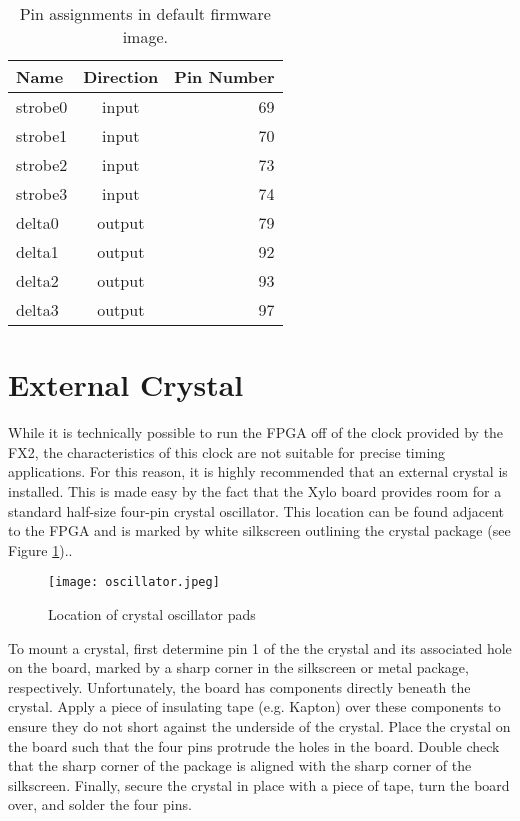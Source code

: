 \begin{table}
  \center
  \begin{tabular}{|lcr|}
    \hline
    Name    & Direction & Pin Number \\
    \hline
    strobe0 & input  & 69 \\
    strobe1 & input  & 70 \\
    strobe2 & input  & 73 \\
    strobe3 & input  & 74 \\
    \hline
    delta0  & output & 79 \\
    delta1  & output & 92 \\
    delta2  & output & 93 \\
    delta3  & output & 97 \\
    \hline
  \end{tabular}
  \caption{Pin assignments in default firmware image.}
  \label{table:pins}
\end{table}


\section{External Crystal}

While it is technically possible to run the FPGA off of the clock
provided by the FX2, the characteristics of this clock are not
suitable for precise timing applications. For this reason, it is
highly recommended that an external crystal is installed. This is made
easy by the fact that the Xylo board provides room for a standard
half-size four-pin crystal oscillator. This location can be found
adjacent to the FPGA and is marked by white silkscreen outlining the
crystal package (see Figure \ref{fig:crystal})..

\begin{figure}
  \center
  \texttt{[image: oscillator.jpeg]}
  \caption{Location of crystal oscillator pads}
  \label{fig:crystal}
\end{figure}

To mount a crystal, first determine pin 1 of the the crystal and its
associated hole on the board, marked by a sharp corner in the
silkscreen or metal package, respectively. Unfortunately, the board
has components directly beneath the crystal. Apply a piece of
insulating tape (e.g. Kapton) over these components to ensure they do
not short against the underside of the crystal. Place the crystal on
the board such that the four pins protrude the holes in the
board. Double check that the sharp corner of the package is aligned
with the sharp corner of the silkscreen. Finally, secure the crystal
in place with a piece of tape, turn the board over, and solder the
four pins.

